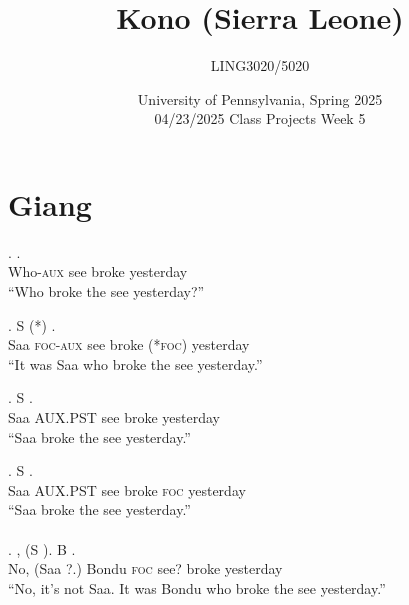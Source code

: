 \documentclass{assets/fieldnotes}
\title{Kono (Sierra Leone)}
\author{LING3020/5020}
\date{University of Pennsylvania, Spring 2025\\04/23/2025 Class Projects Week 5}
\begin{document}
\maketitle

\maketitle
\tableofcontents

\section{Giang}
\exg.    .\\
Who-\textsc{aux} see broke yesterday\\
``Who broke the see yesterday?''

\exg. S    (*) .\\
Saa \textsc{foc-aux} see broke (*\textsc{foc}) yesterday\\
``It was Saa who broke the see yesterday.''

\exg. S    .\\
Saa \textsc{AUX.PST} see broke yesterday\\
``Saa broke the see yesterday.''\\

\exg. S     .\\
Saa \textsc{AUX.PST} see broke \textsc{foc} yesterday\\
``Saa broke the see yesterday.''\\
\\

\exg. , (S ). B    .\\
No, (Saa ?.) Bondu \textsc{foc} see? broke yesterday\\
``No, it's not Saa. It was Bondu who broke the see yesterday.''
\end{document}
